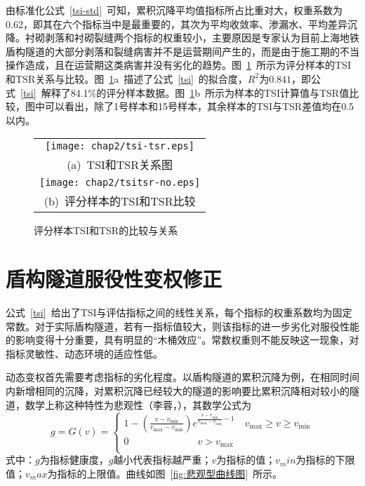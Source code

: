 由标准化公式~\ref{tsi-std}~可知，累积沉降平均值指标所占比重对大，权重系数为0.62，即其在六个指标当中是最重要的，其次为平均收敛率、渗漏水、平均差异沉降。衬砌剥落和衬砌裂缝两个指标的权重较小，主要原因是专家认为目前上海地铁盾构隧道的大部分剥落和裂缝病害并不是运营期间产生的，而是由于施工期的不当操作造成，且在运营期这类病害并没有劣化的趋势。图~\ref{fig:TSI和TSR的比较与关系}~所示为评分样本的TSI和TSR关系与比较。图~\ref{fig:TSI和TSR的比较与关系}a~描述了公式~\ref{tsi}~的拟合度，$R^2$为$0.841$，即公式~\ref{tsi}~解释了84.1\%的评分样本数据。图~\ref{fig:TSI和TSR的比较与关系}b~所示为样本的TSI计算值与TSR值比较，图中可以看出，除了1号样本和15号样本，其余样本的TSI与TSR差值均在0.5以内。

\begin{figure}[htb!] 
    \centering 
    \begin{tabular}{c} 
        \texttt{[image: chap2/tsi-tsr.eps]} \\ 
        (a)~TSI和TSR关系图 \\
        \texttt{[image: chap2/tsitsr-no.eps]} \\ 
        (b)~评分样本的TSI和TSR比较 \\
    \end{tabular}
    \caption{评分样本TSI和TSR的比较与关系} 
    \label{fig:TSI和TSR的比较与关系} 
\end{figure}

\section{盾构隧道服役性变权修正}

公式~\ref{tsi}~给出了TSI与评估指标之间的线性关系，每个指标的权重系数均为固定常数。对于实际盾构隧道，若有一指标值较大，则该指标的进一步劣化对服役性能的影响变得十分重要，具有明显的“木桶效应”。常数权重则不能反映这一现象，对指标灵敏性、动态环境的适应性低。

动态变权首先需要考虑指标的劣化程度。以盾构隧道的累积沉降为例，在相同时间内新增相同的沉降，对累积沉降已经较大的隧道的影响要比累积沉降相对较小的隧道，数学上称这种特性为悲观性（李蓉，\citeyear{李蓉2007基于层次分析法的桥梁健康状态模糊综合评估方法的研究及其应用}），其数学公式为
\begin{equation}
    g=G(v)=\left\{ \begin{matrix}
   1-\left( \frac{v-{{v}_{\min }}}{{{v}_{\max }}-{{v}_{\min }}} \right){{e}^{\frac{v-{{v}_{\min }}}{{{v}_{\max }}-{{v}_{\min }}}-1}}\quad {{v}_{\max }}\ge v\ge {{v}_{\min }}  \\
   0\quad \quad \quad \quad \quad \quad \quad v>{{v}_{\max }}  \\
\end{matrix} \right.
\end{equation}
式中：$g$为指标健康度，$g$越小代表指标越严重；$v$为指标的值；$v_min$为指标的下限值；$v_max$为指标的上限值。曲线如图~\ref{fig:悲观型曲线图}~所示。


